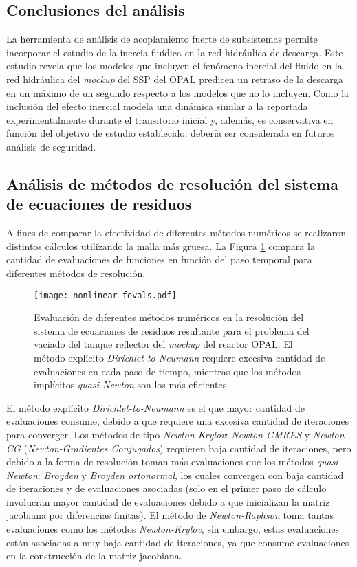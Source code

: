 \subsection*{Conclusiones del análisis}
La herramienta de análisis de acoplamiento fuerte de subsistemas permite incorporar el estudio de la inercia fluídica en la red hidráulica de descarga.
Este estudio revela que los modelos que incluyen el fenómeno inercial del fluido en la red hidráulica del \textit{mockup} del SSP del OPAL predicen un retraso de la descarga en un máximo de un segundo 
respecto a los modelos que no lo incluyen.
Como la inclusión del efecto inercial modela una dinámica similar a la reportada experimentalmente durante el transitorio inicial y,
además, es conservativa en función del objetivo de estudio establecido, debería ser considerada en futuros análisis de seguridad.

\subsection*{Análisis de métodos de resolución del sistema de ecuaciones de residuos}

A fines de comparar la efectividad de diferentes métodos numéricos se realizaron distintos cálculos utilizando la malla más gruesa.
La Figura \ref{nonlinear_fevals} compara la cantidad de evaluaciones de funciones en función del paso temporal para diferentes métodos de resolución.

\begin{figure}[ht]
\centering
\texttt{[image: nonlinear\_fevals.pdf]}
\caption[Evaluación de diferentes métodos numéricos no lineales en el problema del vaciado del tanque reflector del \textit{mockup} del reactor OPAL]
{Evaluación de diferentes métodos numéricos en la resolución del sistema de ecuaciones de residuos resultante para el problema del vaciado del tanque reflector del \textit{mockup} del reactor OPAL.
El método explícito \textit{Dirichlet-to-Neumann} requiere excesiva cantidad de evaluaciones en cada paso de tiempo,
mientras que los métodos implícitos \textit{quasi-Newton} son los más eficientes.}
\label{nonlinear_fevals}
\end{figure}

El método explícito \textit{Dirichlet-to-Neumann} es el que mayor cantidad de evaluaciones consume, debido a que requiere una excesiva cantidad de iteraciones para converger.
Los métodos de tipo \textit{Newton-Krylov}: \textit{Newton-GMRES} y \textit{Newton-CG} (\textit{Newton-Gradientes Conjugados}) requieren baja cantidad de iteraciones, 
pero debido a la forma de resolución toman más evaluaciones que los métodos \textit{quasi-Newton}: \textit{Broyden} y \textit{Broyden ortonormal},
los cuales convergen con baja cantidad de iteraciones y de evaluaciones asociadas
(solo en el primer paso de cálculo involucran mayor cantidad de evaluaciones debido a que inicializan la matriz jacobiana por diferencias finitas).
El método de \textit{Newton-Raphson} toma tantas evaluaciones como los métodos \textit{Newton-Krylov},
sin embargo, estas evaluaciones están asociadas a muy baja cantidad de iteraciones,
ya que consume evaluaciones en la construcción de la matriz jacobiana.

